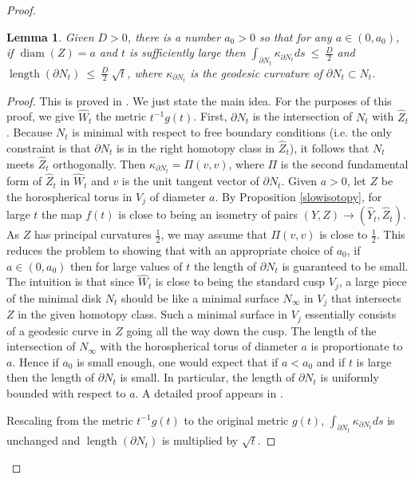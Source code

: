 \documentclass[12pt]{amsart}
\newcommand{\D}{\partial}
\newcommand{\diam}{\operatorname{diam}}
\newcommand{\length}{\operatorname{length}}
\numberwithin{equation}{section}
\theoremstyle{plain}
\newtheorem{lemma}[equation]{Lemma}
\theoremstyle{definition}
\theoremstyle{remark}
\begin{document}
\begin{proof}
\begin{lemma} \label{Hamlemma}
Given $D > 0$, there is a number $a_0 > 0$
so that for any $a \in (0,a_0)$, if $\diam(Z) = a$ and $t$ is
sufficiently large then
$\int_{\D N_t}\kappa_{\D N_t}ds \: \le \: \frac{D}{2}$ and
$\length(\D N_t) \: \le \: \frac{D}{2} \: \sqrt{t}$,
where $\kappa_{\D N_t}$ is the geodesic curvature of
$\D N_t \subset N_t$.
\end{lemma}
\begin{proof}
This is proved in \cite[Sections 11 and 12]{Hamiltonn}. We just state the
main idea.  For the purposes of this proof, we give $\hat W_t$ the
metric $t^{-1} g(t)$. First,  $\D N_t$ is the intersection of $N_t$ with
$\hat Z_t$. Because $N_t$ is minimal with respect to free boundary
conditions (i.e. the only constraint is that $\D N_t$ is in the
right homotopy class in $\hat Z_t$), it follows that $N_t$ meets
$\hat Z_t$ orthogonally. Then $\kappa_{\D N_t} =
\Pi(v,v)$, where $\Pi$ is the second fundamental form of
$\hat Z_t$ in $\hat W_t$ and $v$ is the unit tangent vector of $\D N_t$.
Given $a>0$, let $Z$ be the horospherical torus
in $V_j$ of diameter
$a$.
By Proposition \ref{slowisotopy},
for large $t$ the map $f(t)$ is close to being an isometry of pairs
$(Y, Z) \rightarrow (\hat Y_t, \hat Z_t)$. 
As $Z$ has principal
curvatures $\frac12$, we may assume that
$\Pi(v,v)$ is close to $\frac12$. This reduces the problem to showing that
with an appropriate choice of $a_0$, if $a \in (0, a_0)$ then
for large values of $t$ the length of
$\D N_t$ is guaranteed to be small. The intuition is that since
$\hat W_t$ is close to being the standard cusp $V_j$, a large piece of
the minimal disk
$N_t$ should be like a minimal surface $N_\infty$  in $V_j$
that intersects $Z$ in the given homotopy class.  Such a minimal
surface in $V_j$ essentially consists of a
geodesic curve in $Z$ going all the way down the cusp. The 
length of the intersection of $N_\infty$ with the horospherical
torus of diameter $a$ is proportionate to $a$.  Hence if $a_0$ is small enough, one
would expect that if $a < a_0$ and if $t$ is large then
the length of $\D N_t$ is small.
In particular, the length of $\D N_t$ is uniformly bounded with 
respect to $a$.
 A detailed proof appears in
\cite[Section 12]{Hamiltonn}.

Rescaling from the metric $t^{-1} g(t)$ to the original metric $g(t)$,
$\int_{\D N_t}\kappa_{\D N_t}ds$ is unchanged and
$\length(\D N_t)$ is multiplied by $\sqrt{t}$.
\end{proof}


\end{proof}
\end{document}
